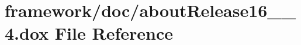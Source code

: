 \hypertarget{about_release16__10__4_8dox}{}\section{framework/doc/about\+Release16\+\_\+\_\+4.dox File Reference}
\label{about_release16__10__4_8dox}
